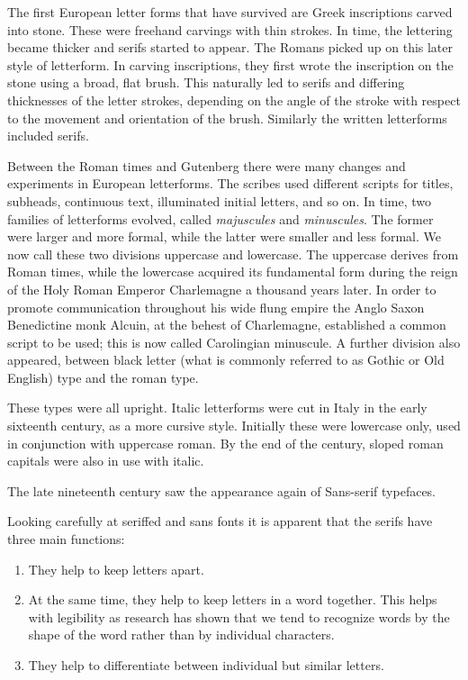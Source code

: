 \documentclass[10pt,a4paper,oneside,extrafontsizes]{memoir}%
\begin{document}
\begin{paracol}{2}
\switchEng
    The first European letter forms that have survived are Greek inscriptions
carved into stone. These were freehand carvings with thin strokes. In time,
the lettering became thicker and serifs started to appear. The Romans
picked up on this later style of letterform. In carving inscriptions, they
first wrote the inscription on the stone using a broad, flat brush. This
naturally led to serifs and differing thicknesses of the letter strokes,
depending on the angle of the stroke with respect to the movement and
orientation of the brush. Similarly the written letterforms included
serifs.

    Between the Roman times and Gutenberg there were many changes and
experiments in European letterforms. The scribes used different scripts
for titles, subheads, continuous text, illuminated initial letters, and so
on. In time, two families of letterforms evolved, 
called \emph{majuscules} and \emph{minuscules}. 
The former were larger and more formal, while the latter
were smaller and less formal. We now call these two divisions uppercase and
lowercase. The uppercase derives from Roman times, while the lowercase
acquired its fundamental form during the reign of the Holy Roman Emperor
Charlemagne a thousand years later. In order to 
promote communication
throughout his wide flung empire the Anglo Saxon Benedictine monk 
Alcuin, at the behest of Charlemagne, established a common
script to be used; this is now called Carolingian 
minuscule.
A further division also appeared, between black letter (what is
commonly referred to as Gothic or Old English) type and the roman type.

    These types were all upright. Italic letterforms were 
cut in Italy
in the early sixteenth century, as a more cursive style. Initially these were
lowercase only, used in conjunction with uppercase roman. By the end of
the century, sloped roman capitals were also in use with italic.

    The late nineteenth century saw the appearance again of 
Sans-serif
typefaces.

    Looking carefully at seriffed and sans fonts it is apparent that
the serifs have three main functions:
\begin{enumerate}
\item They help to keep letters apart.
\item At the same time, they help to keep letters in a word together. This
  helps with legibility as research has shown that 
  we tend to recognize
  words by the shape of the word rather than by individual characters.
\item They help to differentiate between individual but similar letters.
\end{enumerate}


\end{paracol}
\end{document}
